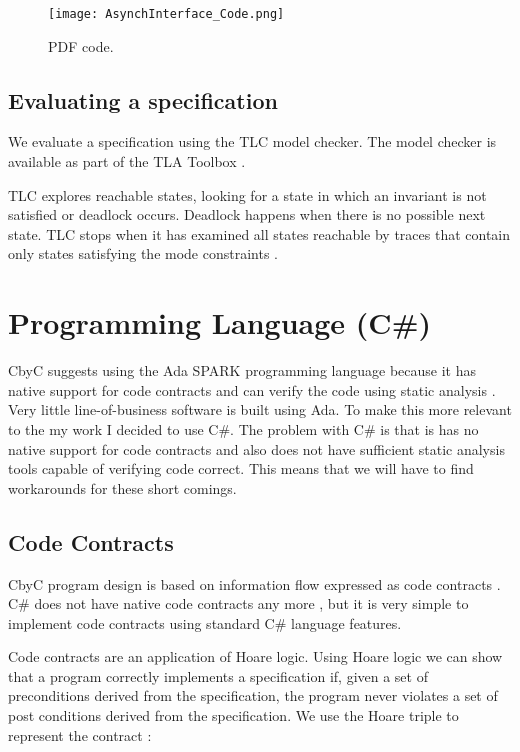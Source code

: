 \begin{figure}[H]
	\centering
	\texttt{[image: AsynchInterface\_Code.png]}
	\decoRule
	\caption{PDF code.}
	\label{fig:PDFCode}
\end{figure}

\subsection{Evaluating a specification}
We evaluate a specification using the TLC model checker. The model checker is available as part of the 
TLA Toolbox \parencite{The_TLA_Toolbox}.

TLC explores reachable states, looking for a state in which an invariant is not satisfied or
deadlock occurs. Deadlock happens when there is no possible next state. TLC stops 
when it has examined all states reachable by traces that contain only states
satisfying the mode constraints \parencite{ModelCheckingTLASpecifications}.

\section{Programming Language (C\#)}

CbyC suggests using the Ada SPARK programming language because it has native
support for code contracts and can verify the code using static analysis \parencite{CbyCPraxis}.
Very little line-of-business software is built using Ada. To make this more relevant 
to the my work I decided to use C\#. The problem with C\# is that is has no native
support for code contracts and also does not have sufficient static analysis tools 
capable of verifying code correct. This means that we will have to find workarounds
for these short comings. 

\subsection{Code Contracts}

CbyC program design is based on information flow expressed as code contracts 
\parencite{CbyCMan}. C\# does not have native code contracts any more \parencite{NoCodeContracts},
but it is very simple to implement code contracts using standard C\# language features.

Code contracts are an application of Hoare logic. Using Hoare logic
we can show that a program correctly implements a specification if, given a set of 
preconditions derived from the specification, the program never violates a set of
post conditions derived from the specification. We use the Hoare triple to 
represent the contract \parencite{BasisForProgramming}:

